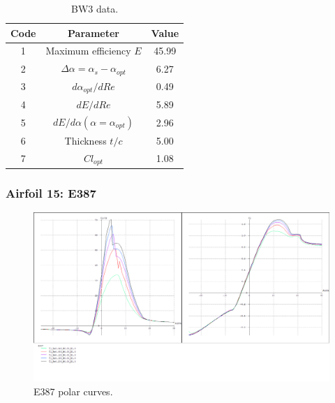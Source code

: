 \documentclass[../TFG_Annex.tex]{subfiles}
\begin{document}
\begin{table}[h!]
	\centering
	\begin{tabular}{c|c|c}
		Code & Parameter                                    & Value  \\ \hline
		1    & Maximum efficiency $E$                      &   45.99    \\
		2    & $\Delta \alpha=\alpha_{s}-\alpha_{opt}$    &         6.27          \\
		3    & ${d\alpha_{opt}}/{dRe}$                     &            0.49     \\
		4    & ${dE}/{dRe}$                                &        5.89     \\
		5    & ${dE}/{d \alpha} (\alpha=\alpha_{opt})$      &           2.96        \\
		6    & Thickness $t/c$                            &              5.00      \\
		7    & $Cl_{opt}$  &   1.08
	\end{tabular}
	\caption{BW3 data.}
	\label{tab:Airf14}
\end{table}



\newpage
\subsubsection{Airfoil 15: E387}

\begin{figure}[h!]
	\centering
	\includegraphics[width=1\linewidth]{"../../04-Airfoil selection/Imatges airfoils/15-E387"}
	\caption{E387 polar curves.}
	\label{fig:15-E387}
\end{figure}
\end{document}
